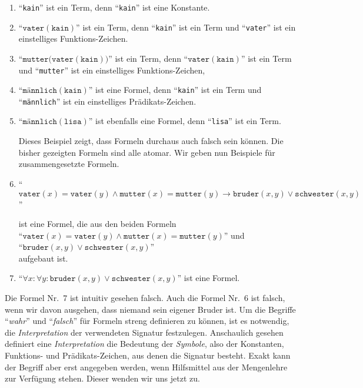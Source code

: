 \begin{enumerate}
\item ``\texttt{kain}'' ist ein Term, denn ``\texttt{kain}'' ist eine Konstante.
\item ``$\mathtt{vater}(\mathtt{kain})$'' ist ein Term, denn ``\texttt{kain}''
      ist ein Term und ``\texttt{vater}'' ist ein einstelliges Funktions-Zeichen.
\item ``$\mathtt{mutter}\bigl(\mathtt{vater}(\mathtt{kain})\bigr)$'' ist ein Term, denn ``$\mathtt{vater}(\mathtt{kain})$'' ist
      ein Term und ``\texttt{mutter}'' ist ein einstelliges Funktions-Zeichen,
\item ``$\texttt{m\"{a}nnlich}(\mathtt{kain})$'' ist eine Formel, denn
      ``\texttt{kain}'' ist ein Term und
      ``\texttt{m\"{a}nnlich}'' ist ein einstelliges Pr\"{a}dikats-Zeichen.
\item ``$\texttt{m\"{a}nnlich}(\mathtt{lisa})$'' ist ebenfalls eine Formel, denn
      ``\texttt{lisa}'' ist ein Term. 

      Dieses Beispiel zeigt, dass Formeln durchaus auch falsch sein k\"{o}nnen.  Die bisher
      gezeigten Formeln sind alle atomar.  Wir geben nun Beispiele f\"{u}r zusammengesetzte
      Formeln.
\item ``$\mathtt{vater}(x) = \mathtt{vater}(y) \wedge \mathtt{mutter}(x) = \mathtt{mutter}(y)
         \rightarrow       \mathtt{bruder}(x,y) \vee \mathtt{schwester}(x,y)$''
      
      ist eine Formel, die aus den beiden Formeln \\[0.2cm]
      \hspace*{1.3cm}  ``$\mathtt{vater}(x) = \mathtt{vater}(y) \wedge \mathtt{mutter}(x) = \mathtt{mutter}(y)$'' \quad und \\[0.2cm]
      \hspace*{1.3cm}  ``$\mathtt{bruder}(x,y) \vee \mathtt{schwester}(x,y)$'' \\[0.2cm]
      aufgebaut ist.  
\item ``$\forall x\colon \forall y\colon \mathtt{bruder}(x,y) \vee \mathtt{schwester}(x,y)$''   ist eine Formel.
\end{enumerate}
Die Formel Nr.~7 ist intuitiv gesehen falsch. 
Auch die Formel Nr.~6 ist falsch, wenn wir davon ausgehen, dass niemand sein eigener
Bruder ist.
Um die Begriffe ``\emph{wahr}'' und ``\emph{falsch}'' f\"{u}r Formeln streng definieren zu k\"{o}nnen,
ist es notwendig, die \emph{Interpretation} der verwendeten Signatur festzulegen. 
Anschaulich gesehen definiert eine \emph{Interpretation} die Bedeutung der \emph{Symbole},
also der Konstanten, Funktions- und Pr\"{a}dikats-Zeichen, aus denen die Signatur besteht.
Exakt kann der Begriff aber erst angegeben werden, wenn Hilfsmittel aus der Mengenlehre
zur Verf\"{u}gung stehen.  Dieser wenden wir uns jetzt zu.

